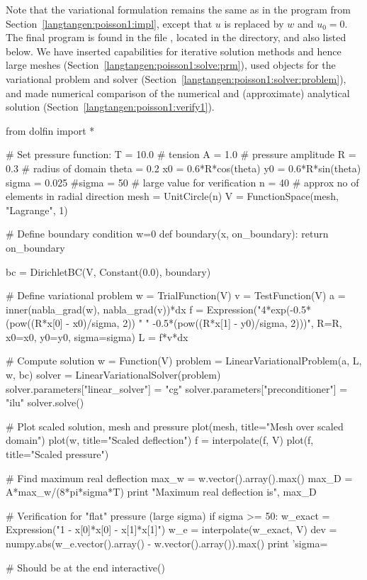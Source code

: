 Note that the variational formulation remains the same as in the
program from Section~\ref{langtangen:poisson1:impl}, except that $u$ is
replaced by $w$ and $u_0=0$.
The final program is found in the file , located
in the  directory, and also listed below.
We have inserted capabilities for iterative solution methods and
hence large meshes (Section~\ref{langtangen:poisson1:solve:prm}),
used objects for the variational problem and solver
(Section~\ref{langtangen:poisson1:solver:problem}), and made numerical
comparison of the numerical and (approximate) analytical solution
(Section~\ref{langtangen:poisson1:verify1}).
\begin{python}
from dolfin import *

# Set pressure function:
T = 10.0  # tension
A = 1.0   # pressure amplitude
R = 0.3   # radius of domain
theta = 0.2
x0 = 0.6*R*cos(theta)
y0 = 0.6*R*sin(theta)
sigma = 0.025
#sigma = 50  # large value for verification
n = 40   # approx no of elements in radial direction
mesh = UnitCircle(n)
V = FunctionSpace(mesh, "Lagrange", 1)

# Define boundary condition w=0
def boundary(x, on_boundary):
    return on_boundary

bc = DirichletBC(V, Constant(0.0), boundary)

# Define variational problem
w = TrialFunction(V)
v = TestFunction(V)
a = inner(nabla_grad(w), nabla_grad(v))*dx
f = Expression("4*exp(-0.5*(pow((R*x[0] - x0)/sigma, 2)) "
               "      -0.5*(pow((R*x[1] - y0)/sigma, 2)))",
               R=R, x0=x0, y0=y0, sigma=sigma)
L = f*v*dx

# Compute solution
w = Function(V)
problem = LinearVariationalProblem(a, L, w, bc)
solver  = LinearVariationalSolver(problem)
solver.parameters["linear_solver"] = "cg"
solver.parameters["preconditioner"] = "ilu"
solver.solve()

# Plot scaled solution, mesh and pressure
plot(mesh, title="Mesh over scaled domain")
plot(w, title="Scaled deflection")
f = interpolate(f, V)
plot(f, title="Scaled pressure")

# Find maximum real deflection
max_w = w.vector().array().max()
max_D = A*max_w/(8*pi*sigma*T)
print "Maximum real deflection is", max_D

# Verification for "flat" pressure (large sigma)
if sigma >= 50:
    w_exact = Expression("1 - x[0]*x[0] - x[1]*x[1]")
    w_e = interpolate(w_exact, V)
    dev = numpy.abs(w_e.vector().array() - w.vector().array()).max()
    print 'sigma=%

# Should be at the end
interactive()
\end{python}

